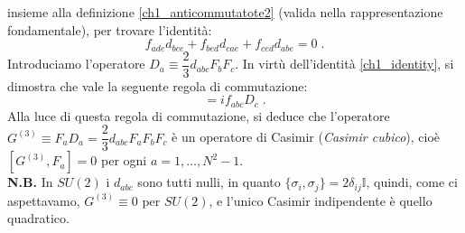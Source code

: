 \documentclass[12pt,a4paper]{article}
\theoremstyle{definition}
\numberwithin{equation}{section}
\begin{document}
insieme alla definizione \eqref{ch1_anticommutatote2} (valida nella rappresentazione fondamentale), per trovare l'identità:
\begin{equation}
f_{ade}d_{bce}+f_{bed}d_{cae}+f_{ced}d_{abe}=0\;. \label{ch1_identity}
\end{equation}
Introduciamo l'operatore $D_a\equiv\dfrac{2}{3}d_{abc}F_bF_c$. In virtù dell'identità \eqref{ch1_identity}, si dimostra che vale la seguente regola di commutazione:
\begin{equation}
[D_a,F_b]=if_{abc}D_c\;.
\end{equation}
Alla luce di questa regola di commutazione, si deduce che l'operatore $G^{(3)}\equiv F_aD_a=\dfrac{2}{3}d_{abc}F_aF_bF_c$ è un operatore di Casimir (\emph{Casimir cubico}), cioè $[G^{(3)},F_a]=0$ per ogni $a=1,\ldots,N^2-1$. \\
\textbf{N.B.} In $SU(2)$ i $d_{abc}$ sono tutti nulli, in quanto $\{\sigma_i,\sigma_j\}=2\delta_{ij}\mathbb{I}$, quindi, come ci aspettavamo, $G^{(3)}\equiv0$ per $SU(2)$, e l'unico Casimir indipendente è quello quadratico.
\end{document}
